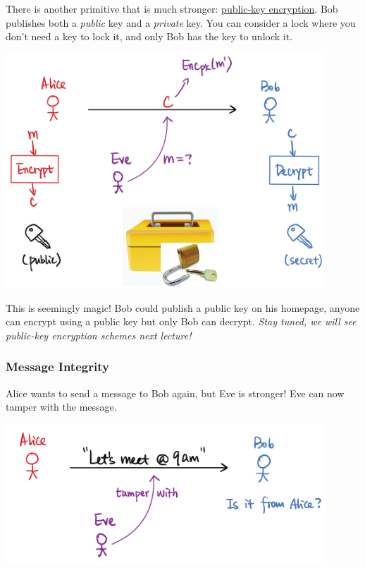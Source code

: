 \begin{definition}
    There is another primitive that is much stronger: \ul{public-key encryption}. Bob publishes both a \emph{public} key and a \emph{private} key. You can consider a lock where you don't need a key to lock it, and only Bob has the key to unlock it.

    \begin{center}
        \includegraphics[width=0.9\textwidth]{images/2023-01-26/public_key.png}
    \end{center}

    This is seemingly magic! Bob could publish a public key on his homepage, anyone can encrypt using a public key but only Bob can decrypt. \emph{Stay tuned, we will see public-key encryption schemes next lecture!}
\end{definition}

\subsubsection{Message Integrity}
Alice wants to send a message to Bob again, but Eve is stronger! Eve can now tamper with the message.

\begin{center}
    \includegraphics[width=0.9\textwidth]{images/2023-01-26/integrity.png}
\end{center}

